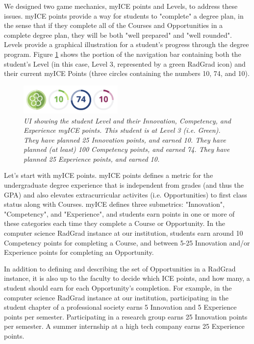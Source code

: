 \documentclass[acmsmall,nonacm]{acmart}
\begin{document}
We designed two game mechanics, myICE points and Levels, to address these issues.  myICE points provide a way for students to "complete" a degree plan, in the sense that if they complete all of the Courses and Opportunities in a complete degree plan, they will be both "well prepared" and "well rounded".  Levels provide a graphical illustration for a student's progress through the degree program. Figure \ref{fig:ice} shows the portion of the navigation bar containing both the student's Level (in this case, Level 3, represented by a green RadGrad icon) and their current myICE Points (three circles containing the numbers 10, 74, and 10).

\begin{figure}[t]
\centering
\includegraphics[width=2in]{ice-pane.png}
\caption{\em UI showing the student Level and their Innovation, Competency, and Experience myICE points. This student is at Level 3 (i.e. Green). They have planned 25 Innovation points, and earned 10. They have planned (at least) 100 Competency points, and earned 74. They have planned 25 Experience points, and earned 10.  }
\label{fig:ice}
\end{figure}

Let's start with myICE points.  myICE points defines a metric for the undergraduate degree experience that is independent from grades (and thus the GPA) and also elevates extracurricular activites (i.e. Opportunities) to first class status along with Courses. myICE defines three submetrics: "Innovation", "Competency", and "Experience", and students earn points in one or more of these categories each time they complete a Course or Opportunity. In the computer science RadGrad instance at our institution, students earn around 10 Competency points for completing a Course, and between 5-25 Innovation and/or Experience points for completing an Opportunity.

In addition to defining and describing the set of Opportunities in a RadGrad instance, it is also up to the faculty to decide which ICE points, and how many, a student should earn for each Opportunity's completion. For example, in the computer science RadGrad instance at our institution, participating in the student chapter of a professional society earns 5 Innovation and 5 Experience points per semester.  Participating in a research group earns 25 Innovation points per semester.  A summer internship at a high tech company earns 25 Experience points.
\end{document}
